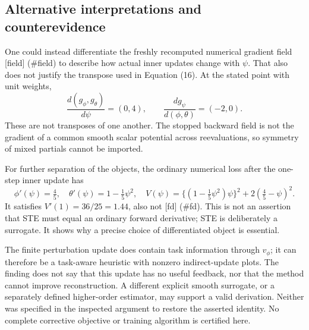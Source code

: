 \documentclass[10pt]{article}
\begin{document}
\subsection*{Alternative interpretations and counterevidence}
One could instead differentiate the freshly recomputed numerical gradient field [field] (\#field) to describe how actual inner updates change with \(\psi\). That also does not justify the transpose used in Equation (16). At the stated point with unit weights, \[\frac{d(g_\phi,g_\theta)}{d\psi}=(0,4),\qquad
 \frac{d g_\psi}{d(\phi,\theta)}=(-2,0).\] These are not transposes of one another. The stopped backward field is not the gradient of a common smooth scalar potential across reevaluations, so symmetry of mixed partials cannot be imported.\par
For further separation of the objects, the ordinary numerical loss after the one-step inner update has \[\phi'(\psi)=\tfrac45,\quad \theta'(\psi)=1-\tfrac15\psi^2,\quad
 V(\psi)=\{(1-\tfrac15\psi^2)\psi\}^2+
                2(\tfrac45-\psi)^2 .\] It satisfies \(V'(1)=36/25=1.44\), also not [fd] (\#fd). This is not an assertion that STE must equal an ordinary forward derivative; STE is deliberately a surrogate. It shows why a precise choice of differentiated object is essential.\par
The finite perturbation update does contain task information through \(v_\phi\); it can therefore be a task-aware heuristic with nonzero indirect-update plots. The finding does not say that this update has no useful feedback, nor that the method cannot improve reconstruction. A different explicit smooth surrogate, or a separately defined higher-order estimator, may support a valid derivation. Neither was specified in the inspected argument to restore the asserted identity. No complete corrective objective or training algorithm is certified here.\par
\end{document}
